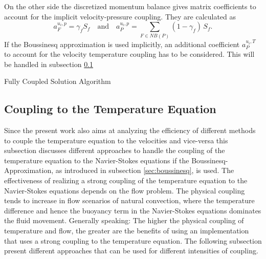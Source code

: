 On the other side the discretized momentum balance gives matrix coefficients to account for the implicit velocity-pressure coupling. They are calculated as
\begin{displaymath}
  a_F^{u_i,p} =  \gamma_f S_f \quad \text{and} \quad a_P^{u_i,p} = \sum_{F \in NB(P)} (1-\gamma_f) \, S_f.
\end{displaymath}
If the Boussinesq approximation is used implicitly, an additional coefficient \(a_P^{u_i,T}\) to account for the velocity temperature coupling has to be considered. This will be handled in subsection \ref{sec:temperaturecoupling}

\begin{algorithm}
\label{al:simple}
\caption{Fully Coupled Solution Algorithm}
\begin{algorithmic}
\Else
\EndIf
{}
\EndIf
\EndWhile
\end{algorithmic}
\end{algorithm}

\subsection{Coupling to the Temperature Equation}
\label{sec:temperaturecoupling}

Since the present work also aims at analyzing the efficiency of different methods to couple the temperature equation to the velocities and vice-versa this subsection discusses different approaches to handle the coupling of the temperature equation to the Navier-Stokes equations if the Boussinesq-Approximation, as introduced in subsection \ref{sec:boussinesq}, is used. The effectiveness of realizing a strong coupling of the temperature equation to the Navier-Stokes equations depends on the flow problem. The physical coupling tends to increase in flow scenarios of natural convection, where the temperature difference and hence the buoyancy term in the Navier-Stokes equations dominates the fluid movement. Generally speaking: The higher the physical coupling of temperature and flow, the greater are the benefits of using an implementation that uses a strong coupling to the temperature equation. The following subsection present different approaches that can be used for different intensities of coupling.
      
